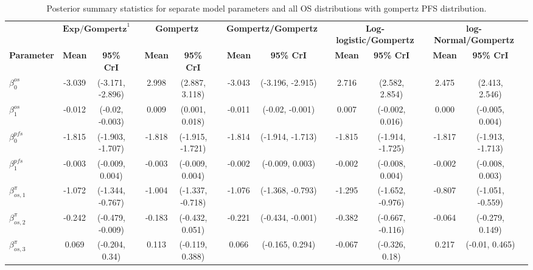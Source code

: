 \documentclass[AMA,STIX1COL]{WileyNJD-v2}
\begin{document}
\begin{landscape}
\begin{center}
\begin{table}[t]
\caption{Posterior summary statistics for separate model parameters and all OS distributions with gompertz PFS distribution. \label{tab:post_sep_pfs_gompertz}}
\centering
\begin{tabular}{l c c c c c c c c c c c c c c c}
\toprule
\multicolumn{1}{l}{} & \multicolumn{2}{c}{$\textbf{Exp/Gompertz}^1$} & & \multicolumn{2}{c}{\textbf{Gompertz}} & & \multicolumn{2}{c}{\textbf{Gompertz/Gompertz}} & & \multicolumn{2}{c}{\textbf{Log-logistic/Gompertz}} & & \multicolumn{2}{c}{\textbf{log-Normal/Gompertz}}\\
\cmidrule{2-3}\cmidrule{5-6}\cmidrule{8-9}\cmidrule{11-12}\cmidrule{14-15}
\textbf{Parameter} & \textbf{Mean} & \textbf{95\% CrI} & & \textbf{Mean} & \textbf{95\% CrI} & & \textbf{Mean} & \textbf{95\% CrI} & & \textbf{Mean} & \textbf{95\% CrI} & & \textbf{Mean} & \textbf{95\% CrI}\\
\midrule
$\beta^{os}_0$ & -3.039 & (-3.171, -2.896) &  & 2.998 & (2.887, 3.118) &  & -3.043 & (-3.196, -2.915) &  & 2.716 & (2.582, 2.854) &  & 2.475 & (2.413, 2.546) & \\
$\beta^{os}_1$ & -0.012 & (-0.02, -0.003) &  & 0.009 & (0.001, 0.018) &  & -0.011 & (-0.02, -0.001) &  & 0.007 & (-0.002, 0.016) &  & 0.000 & (-0.005, 0.004) & \\
$\beta^{pfs}_0$ & -1.815 & (-1.903, -1.707) &  & -1.818 & (-1.915, -1.721) &  & -1.814 & (-1.914, -1.713) &  & -1.815 & (-1.914, -1.725) &  & -1.817 & (-1.913, -1.713) & \\
$\beta^{pfs}_1$ & -0.003 & (-0.009, 0.004) &  & -0.003 & (-0.009, 0.004) &  & -0.002 & (-0.009, 0.003) &  & -0.002 & (-0.008, 0.004) &  & -0.002 & (-0.008, 0.003) & \\
$\beta^{\pi}_{os, 1}$ & -1.072 & (-1.344, -0.767) &  & -1.004 & (-1.337, -0.718) &  & -1.076 & (-1.368, -0.793) &  & -1.295 & (-1.652, -0.976) &  & -0.807 & (-1.051, -0.559) & \\
$\beta^{\pi}_{os, 2}$ & -0.242 & (-0.479, -0.009) &  & -0.183 & (-0.432, 0.051) &  & -0.221 & (-0.434, -0.001) &  & -0.382 & (-0.667, -0.116) &  & -0.064 & (-0.279, 0.149) & \\
$\beta^{\pi}_{os, 3}$ & 0.069 & (-0.204, 0.34) &  & 0.113 & (-0.119, 0.388) &  & 0.066 & (-0.165, 0.294) &  & -0.067 & (-0.326, 0.18) &  & 0.217 & (-0.01, 0.465) & \\

\end{tabular}
\end{table}
\end{center}
\end{landscape}
\end{document}
